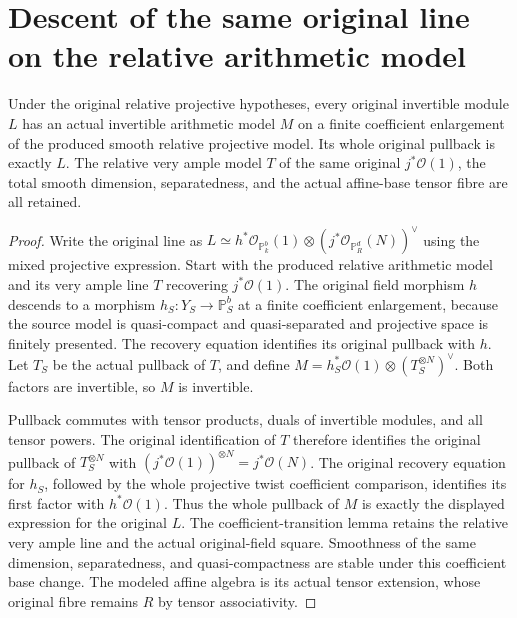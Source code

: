 \section{Descent of the same original line on the relative arithmetic model}

\begin{lemma}
\label{lem:kn-relative-arithmetic-original-line-model}
\leanok
Under the original relative projective hypotheses, every original
invertible module $L$ has an actual invertible arithmetic model
$M$ on a finite coefficient enlargement of the produced smooth
relative projective model.  Its whole original pullback is exactly
$L$.  The relative very ample model $T$ of the same original
$j^*\mathcal O(1)$, the total smooth dimension, separatedness,
and the actual affine-base tensor fibre are all retained.
\end{lemma}
\begin{proof}
Write the original line as
$L\simeq h^*\mathcal O_{\mathbb P_k^b}(1)
\otimes(j^*\mathcal O_{\mathbb P_R^d}(N))^\vee$
using the mixed projective expression.  Start with the produced
relative arithmetic model and its very ample line $T$ recovering
$j^*\mathcal O(1)$.  The original field morphism $h$ descends to a
morphism $h_S:Y_S\to\mathbb P_S^b$ at a finite coefficient
enlargement, because the source model is quasi-compact and
quasi-separated and projective space is finitely presented.
The recovery equation identifies its original pullback with $h$.
Let $T_S$ be the actual pullback of $T$, and define
$M=h_S^*\mathcal O(1)\otimes(T_S^{\otimes N})^\vee$.
Both factors are invertible, so $M$ is invertible.

Pullback commutes with tensor products, duals of invertible
modules, and all tensor powers.  The original identification of
$T$ therefore identifies the original pullback of
$T_S^{\otimes N}$ with
$(j^*\mathcal O(1))^{\otimes N}=j^*\mathcal O(N)$.
The original recovery equation for $h_S$, followed by the whole
projective twist coefficient comparison, identifies its first
factor with $h^*\mathcal O(1)$.  Thus the whole pullback of $M$
is exactly the displayed expression for the original $L$.
The coefficient-transition lemma retains the relative very ample
line and the actual original-field square.  Smoothness of the
same dimension, separatedness, and quasi-compactness are stable
under this coefficient base change.  The modeled affine algebra
is its actual tensor extension, whose original fibre remains $R$
by tensor associativity.
\end{proof}
